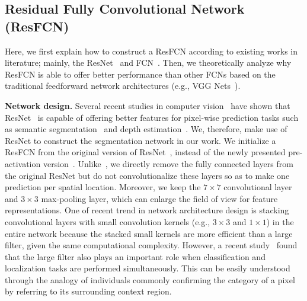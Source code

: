 \documentclass[journal]{IEEEtran}
\begin{document}
\subsection{Residual Fully Convolutional Network (ResFCN)}
\label{sec:b}
Here, we first explain how to construct a ResFCN according to existing works in literature; mainly, the ResNet~\cite{ResNet} and FCN~\cite{FCN}. Then, we theoretically analyze why ResFCN is able to offer better performance than other FCNs based on the traditional feedforward network architectures (e.g., VGG Nets~\cite{VGGNet}).
\par
\textbf{Network design.} Several recent studies in computer vision~\cite{Zhaocvpr17,Wu16,Laina16} have shown that ResNet~\cite{ResNet} is capable of offering better features for pixel-wise prediction tasks such as semantic segmentation~\cite{Zhaocvpr17,Wu16} and depth estimation~\cite{Laina16}. We, therefore, make use of ResNet to construct the segmentation network in our work. We initialize a ResFCN from the original version of ResNet~\cite{ResNet}, instead of the newly presented pre-activation version~\cite{ResNet2}. Unlike~\cite{FCN}, we directly remove the fully connected layers from the original ResNet but do not convolutionalize these layers so as to make one prediction per spatial location. Moreover, we keep the $7\times7$ convolutional layer and $3\times3$ max-pooling layer, which can enlarge the field of view for feature representations. One of recent trend in network architecture design is stacking convolutional layers with small convolution kernels (e.g., $3\times3$ and $1\times1$) in the entire network because the stacked small kernels are more efficient than a large filter, given the same computational complexity. However, a recent study~\cite{LargeKernel} found that the large filter also plays an important role when classification and localization tasks are performed simultaneously. This can be easily understood through the analogy of individuals commonly confirming the category of a pixel by referring to its surrounding context region.
\par
\end{document}
